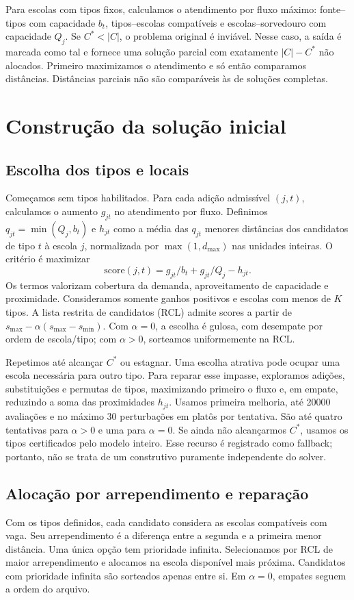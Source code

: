 \documentclass[12pt]{article}
\begin{document}
Para escolas com tipos fixos, calculamos o atendimento por fluxo máximo: fonte--tipos com capacidade $b_t$, tipos--escolas compatíveis e escolas--sorvedouro com capacidade $Q_j$. Se $C^*<|C|$, o problema original é inviável. Nesse caso, a saída é marcada como tal e fornece uma solução parcial com exatamente $|C|-C^*$ não alocados. Primeiro maximizamos o atendimento e só então comparamos distâncias. Distâncias parciais não são comparáveis às de soluções completas.

\section{Construção da solução inicial}
\subsection{Escolha dos tipos e locais}
Começamos sem tipos habilitados. Para cada adição admissível $(j,t)$, calculamos o aumento $g_{jt}$ no atendimento por fluxo. Definimos $q_{jt}=\min(Q_j,b_t)$ e $h_{jt}$ como a média das $q_{jt}$ menores distâncias dos candidatos de tipo $t$ à escola $j$, normalizada por $\max(1,d_{\max})$ nas unidades inteiras. O critério é maximizar
\begin{equation}
 \mathrm{score}(j,t)=g_{jt}/b_t+g_{jt}/Q_j-h_{jt}.
\end{equation}
Os termos valorizam cobertura da demanda, aproveitamento de capacidade e proximidade. Consideramos somente ganhos positivos e escolas com menos de $K$ tipos. A lista restrita de candidatos (RCL) admite scores a partir de $s_{\max}-\alpha(s_{\max}-s_{\min})$. Com $\alpha=0$, a escolha é gulosa, com desempate por ordem de escola/tipo; com $\alpha>0$, sorteamos uniformemente na RCL.

Repetimos até alcançar $C^*$ ou estagnar. Uma escolha atrativa pode ocupar uma escola necessária para outro tipo. Para reparar esse impasse, exploramos adições, substituições e permutas de tipos, maximizando primeiro o fluxo e, em empate, reduzindo a soma das proximidades $h_{jt}$. Usamos primeira melhoria, até 20000 avaliações e no máximo 30 perturbações em platôs por tentativa. São até quatro tentativas para $\alpha>0$ e uma para $\alpha=0$. Se ainda não alcançarmos $C^*$, usamos os tipos certificados pelo modelo inteiro. Esse recurso é registrado como fallback; portanto, não se trata de um construtivo puramente independente do solver.

\subsection{Alocação por arrependimento e reparação}
Com os tipos definidos, cada candidato considera as escolas compatíveis com vaga. Seu arrependimento é a diferença entre a segunda e a primeira menor distância. Uma única opção tem prioridade infinita. Selecionamos por RCL de maior arrependimento e alocamos na escola disponível mais próxima. Candidatos com prioridade infinita são sorteados apenas entre si. Em $\alpha=0$, empates seguem a ordem do arquivo.
\end{document}
